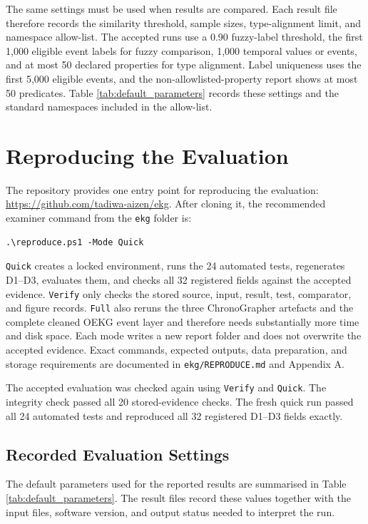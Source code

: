 The same settings must be used when results are compared. Each result file therefore records the similarity threshold, sample sizes, type-alignment limit, and namespace allow-list. The accepted runs use a 0.90 fuzzy-label threshold, the first 1,000 eligible event labels for fuzzy comparison, 1,000 temporal values or events, and at most 50 declared properties for type alignment. Label uniqueness uses the first 5,000 eligible events, and the non-allowlisted-property report shows at most 50 predicates. Table \ref{tab:default_parameters} records these settings and the standard namespaces included in the allow-list.

\section{Reproducing the Evaluation}

The repository provides one entry point for reproducing the evaluation: \url{https://github.com/tadiwa-aizen/ekg}. After cloning it, the recommended examiner command from the \texttt{ekg} folder is:

\begin{verbatim}
.\reproduce.ps1 -Mode Quick
\end{verbatim}

\texttt{Quick} creates a locked environment, runs the 24 automated tests, regenerates D1--D3, evaluates them, and checks all 32 registered fields against the accepted evidence. \texttt{Verify} only checks the stored source, input, result, test, comparator, and figure records. \texttt{Full} also reruns the three ChronoGrapher artefacts and the complete cleaned OEKG event layer and therefore needs substantially more time and disk space. Each mode writes a new report folder and does not overwrite the accepted evidence. Exact commands, expected outputs, data preparation, and storage requirements are documented in \texttt{ekg/REPRODUCE.md} and Appendix A.

The accepted evaluation was checked again using \texttt{Verify} and \texttt{Quick}. The integrity check passed all 20 stored-evidence checks. The fresh quick run passed all 24 automated tests and reproduced all 32 registered D1--D3 fields exactly.

\subsection{Recorded Evaluation Settings}

The default parameters used for the reported results are summarised in Table \ref{tab:default_parameters}. The result files record these values together with the input files, software version, and output status needed to interpret the run.

